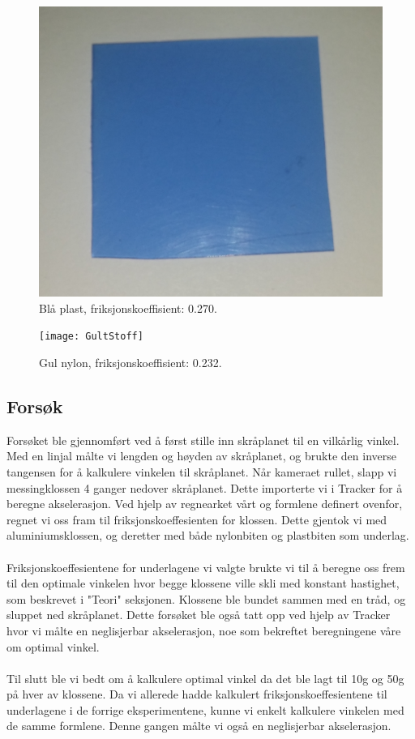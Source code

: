\documentclass[10pt,a4paper]{report}
\begin{document}
\begin{figure}
    \centerline{\includegraphics[scale=0.05]{BlaaPlast}}
    \caption{Blå plast, friksjonskoeffisient: 0.270.}
    \label{fig:1}
\end{figure}
\begin{figure}
    \centerline{\texttt{[image: GultStoff]}}
    \caption{Gul nylon, friksjonskoeffisient: 0.232.}
    \label{fig:2}
\end{figure}

\subsection*{Forsøk}
Forsøket ble gjennomført ved å først stille inn skråplanet til en vilkårlig vinkel. Med en linjal målte vi lengden og høyden av skråplanet, og brukte den inverse tangensen for å kalkulere vinkelen til skråplanet. Når kameraet rullet, slapp vi messingklossen 4 ganger nedover skråplanet. Dette importerte vi i Tracker for å beregne akselerasjon. Ved hjelp av regnearket vårt og formlene definert ovenfor, regnet vi oss fram til friksjonskoeffesienten for klossen. Dette gjentok vi med aluminiumsklossen, og deretter med både nylonbiten og plastbiten som underlag. \\
\\Friksjonskoeffesientene for underlagene vi valgte brukte vi til å beregne oss frem til den optimale vinkelen hvor begge klossene ville skli med konstant hastighet, som beskrevet i "Teori" seksjonen. Klossene ble bundet sammen med en tråd, og sluppet ned skråplanet. Dette forsøket ble også tatt opp ved hjelp av Tracker hvor vi målte en neglisjerbar akselerasjon, noe som bekreftet beregningene våre om optimal vinkel.\\
\\Til slutt ble vi bedt om å kalkulere optimal vinkel da det ble lagt til 10g og 50g på hver av klossene. Da vi allerede hadde kalkulert friksjonskoeffesientene til underlagene i de forrige eksperimentene, kunne vi enkelt kalkulere vinkelen med de samme formlene. Denne gangen målte vi også en neglisjerbar akselerasjon.
\end{document}
